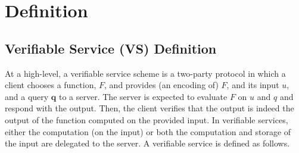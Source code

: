 
\section{Definition}\label{Definition}

\subsection{Verifiable Service (VS) Definition}\label{subsec:VS}
At a high-level, a verifiable service scheme is a two-party protocol in which a client chooses a function, $F$, and provides (an encoding of) $F$, and its input $u$, and a query $\bm{q}$ to a server.  The server is expected to evaluate $F$ on $u$ and $q$ and respond with the output. Then, the client  verifies that the output is indeed the output of the function computed on the provided input. In verifiable services, either the computation (on the input) or both the computation and storage of the input are delegated to the server. A verifiable service is defined as follows. 


